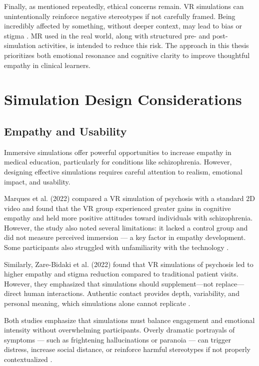 Finally, as mentioned repeatedly, ethical concerns remain. VR simulations can unintentionally reinforce negative stereotypes if not carefully framed. Being incredibly affected by something, without deeper context, may lead to bias or stigma \cite{Rueda2020}. MR used in the real world, along with structured pre- and post-simulation activities, is intended to reduce this risk. The approach in this thesis prioritizes both emotional resonance and cognitive clarity to improve thoughtful empathy in clinical learners.


\section{Simulation Design Considerations}
\subsection{Empathy and Usability}
Immersive simulations offer powerful opportunities to increase empathy in medical education, particularly for conditions like schizophrenia. However, designing effective simulations requires careful attention to realism, emotional impact, and usability.

Marques et al. (2022) compared a VR simulation of psychosis with a standard 2D video and found that the VR group experienced greater gains in cognitive empathy and held more positive attitudes toward individuals with schizophrenia. However, the study also noted several limitations: it lacked a control group and did not measure perceived immersion — a key factor in empathy development. Some participants also struggled with unfamiliarity with the technology \cite{Marques2022}.

Similarly, Zare-Bidaki et al. (2022) found that VR simulations of psychosis led to higher empathy and stigma reduction compared to traditional patient visits. However, they emphasized that simulations should supplement—not replace—direct human interactions. Authentic contact provides depth, variability, and personal meaning, which simulations alone cannot replicate \cite{Zare-Bidaki2022, Hsia2022}.

Both studies emphasize that simulations must balance engagement and emotional intensity without overwhelming participants. Overly dramatic portrayals of symptoms — such as frightening hallucinations or paranoia — can trigger distress, increase social distance, or reinforce harmful stereotypes if not properly contextualized \cite{Ando2011, Chaffin2013, Zare-Bidaki2022}.

